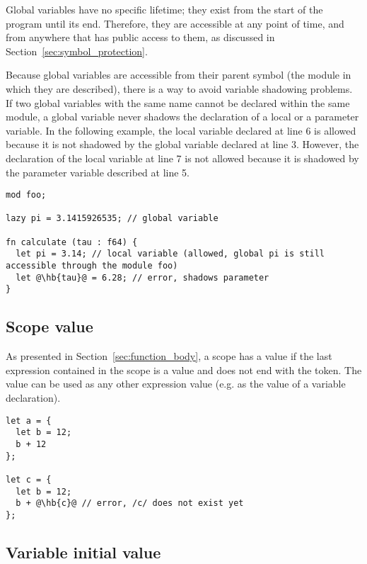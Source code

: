 Global variables have no specific lifetime; they exist from the start of the
program until its end. Therefore, they are accessible at any point of time, and
from anywhere that has public access to them, as discussed in
Section~\ref{sec:symbol_protection}.

Because global variables are accessible from their parent symbol (the module in
which they are described), there is a way to avoid variable shadowing problems.
If two global variables with the same name cannot be declared within the same
module, a global variable never shadows the declaration of a local or a
parameter variable. In the following example, the local variable 
declared at line 6 is allowed because it is not shadowed by the global variable
declared at line 3. However, the declaration of the local variable 
at line 7 is not allowed because it is shadowed by the parameter variable
described at line 5.

\begin{lstlisting}[style=coloredverbatim, escapechar=@]
mod foo;

lazy pi = 3.1415926535; // global variable

fn calculate (tau : f64) {
  let pi = 3.14; // local variable (allowed, global pi is still accessible through the module foo)
  let @\hb{tau}@ = 6.28; // error, shadows parameter
}

\end{lstlisting}

\subsection{Scope value}

As presented in Section~\ref{sec:function_body}, a scope has a value if the last
expression contained in the scope is a value and does not end with the \token{;}
token. The value can be used as any other expression value (e.g. as the value of
a variable declaration).

\begin{lstlisting}[style=coloredverbatim, escapechar=@]
let a = {
  let b = 12;
  b + 12
};

let c = {
  let b = 12;
  b + @\hb{c}@ // error, /c/ does not exist yet
};
\end{lstlisting}

\subsection{Variable initial value}
\label{sec:variable_init_value}

